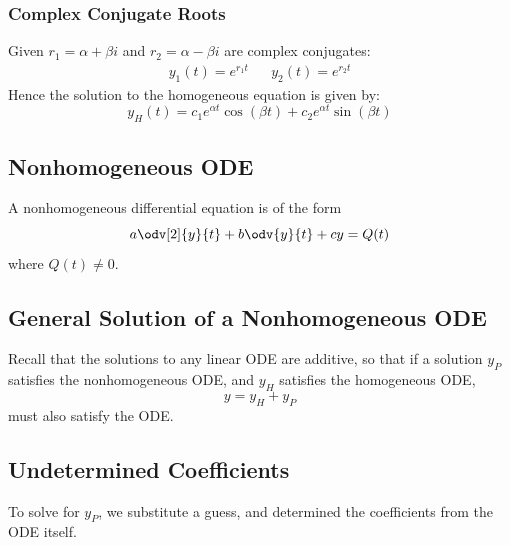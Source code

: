 \documentclass{article}
\begin{document}
\subsubsection{Complex Conjugate Roots}
Given \(r_1 = \alpha + \beta i\) and \(r_2 = \alpha - \beta i\) are complex conjugates:
\begin{align*}
    y_1(t) = e^{r_1t} &  & y_2(t) = e^{r_2t}
\end{align*}
Hence the solution to the homogeneous equation is given by:
\begin{equation*}
    y_H(t) = c_1e^{\alpha t}\cos{\left( \beta t \right)} + c_2e^{\alpha t}\sin{\left( \beta t \right)}
\end{equation*}
\subsection{Nonhomogeneous ODE}
A nonhomogeneous differential equation is of the form
\begin{equation*}
    a \odv[2]{y}{t} + b \odv{y}{t} + c y = Q(t)
\end{equation*}
where \(Q(t)\neq 0\).
\subsection{General Solution of a Nonhomogeneous ODE}
Recall that the solutions to any linear ODE are additive, so that if a solution \(y_P\) satisfies
the nonhomogeneous ODE, and \(y_H\) satisfies the homogeneous ODE,
\begin{equation*}
    y = y_H + y_P
\end{equation*}
must also satisfy the ODE\@.
\subsection{Undetermined Coefficients}
To solve for \(y_P\), we substitute a guess, and
determined the coefficients from the ODE itself.
\end{document}
